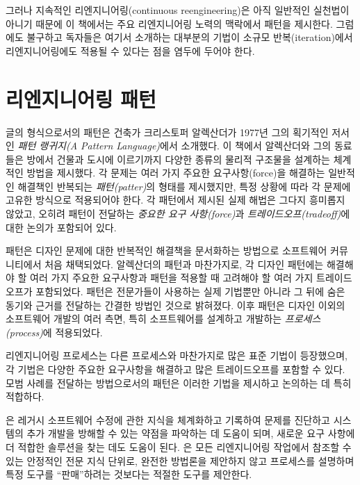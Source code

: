 \documentclass[a4paper,10pt,twoside]{book}
\begin{document}
그러나 지속적인 리엔지니어링(continuous reengineering)은 아직 일반적인 실천법이 아니기 때문에 이 책에서는 주요 리엔지니어링 노력의 맥락에서 패턴을 제시한다. 그럼에도 불구하고 독자들은 여기서 소개하는 대부분의 기법이 소규모 반복(iteration)에서 리엔지니어링에도 적용될 수 있다는 점을 염두에 두어야 한다.

\section{리엔지니어링 패턴}

글의 형식으로서의 패턴은 건축가 크리스토퍼 알렉산더가 1977년 그의 획기적인 저서인 \emph{패턴 랭귀지(A Pattern Language)}에서 소개했다. 이 책에서 알렉산더와 그의 동료들은 방에서 건물과 도시에 이르기까지 다양한 종류의 물리적 구조물을 설계하는 체계적인 방법을 제시했다. 각 문제는 여러 가지 주요한 요구사항(force)을 해결하는 일반적인 해결책인 반복되는 \emph{패턴(patter)}의 형태를 제시했지만, 특정 상황에 따라 각 문제에 고유한 방식으로 적용되어야 한다. 각 패턴에서 제시된 실제 해법은 그다지 흥미롭지 않았고, 오히려 패턴이 전달하는 \emph{중요한 요구 사항(force)}과 \emph{트레이드오프(tradeoff)}에 대한 논의가 포함되어 있다.

패턴은 디자인 문제에 대한 반복적인 해결책을 문서화하는 방법으로 소프트웨어 커뮤니티에서 처음 채택되었다. 알렉산더의 패턴과 마찬가지로, 각 디자인 패턴에는 해결해야 할 여러 가지 주요한 요구사항과 패턴을 적용할 때 고려해야 할 여러 가지 트레이드오프가 포함되었다. 패턴은 전문가들이 사용하는 실제 기법뿐만 아니라 그 뒤에 숨은 동기와 근거를 전달하는 간결한 방법인 것으로 밝혀졌다. 이후 패턴은 디자인 이외의 소프트웨어 개발의 여러 측면, 특히 소프트웨어를 설계하고 개발하는 \emph{프로세스(process)}에 적용되었다.

리엔지니어링 프로세스는 다른 프로세스와 마찬가지로 많은 표준 기법이 등장했으며, 각 기법은 다양한 주요한 요구사항을 해결하고 많은 트레이드오프를 포함할 수 있다. 모범 사례를 전달하는 방법으로서의 패턴은 이러한 기법을 제시하고 논의하는 데 특히 적합하다. 

은 레거시 소프트웨어 수정에 관한 지식을 체계화하고 기록하여 문제를 진단하고 시스템의 추가 개발을 방해할 수 있는 약점을 파악하는 데 도움이 되며, 새로운 요구 사항에 더 적합한 솔루션을 찾는 데도 도움이 된다. 은 모든 리엔지니어링 작업에서 참조할 수 있는 안정적인 전문 지식 단위로, 완전한 방법론을 제안하지 않고 프로세스를 설명하며 특정 도구를 ``판매''하려는 것보다는 적절한 도구를 제안한다. 
\end{document}
